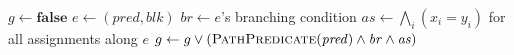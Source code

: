 \begin{algorithmic}
	\State {}
\EndIf
\State $g \gets \textbf{false}$
\State $e \gets (\mathit{pred},\mathit{blk})$
	\State $\mathit{br} \gets e$'s branching condition
	\State $\mathit{as} \gets \bigwedge_i(x_i = y_i)$ for all assignments along $e$
	\State $g \gets g \lor (\Call{PathPredicate}{\mathit{pred}} \land \mathit{br} \land \mathit{as})$
\EndIf
\EndFor
\State {}
\EndFunction
\end{algorithmic}
